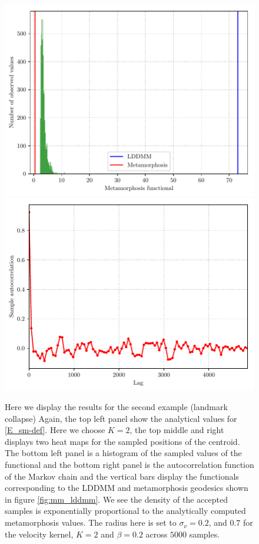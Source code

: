\documentclass[runningheads]{llncs}
\begin{document}
\begin{figure}[h!]
\begin{minipage}{\textwidth}
    \includegraphics[scale=.35]{functional_histogram_squeeze.pdf}
    \includegraphics[scale=.35]{autocorrelation_squeeze.pdf}
    \caption{\footnotesize Here we display the results for the second example (landmark
    collapse) Again, the top left panel show the analytical values for
    \eqref{E_sm-def}. Here we choose $K=2$, the top middle and right displays
    two heat maps for the sampled positions of the centroid. The bottom left
    panel is a histogram of the sampled values of the functional and the bottom
    right panel is the autocorrelation function of the Markov chain and the
    vertical bars display the functionals corresponding to the LDDMM and
    metamorphosis geodesics shown in figure \ref{fig:mm_lddmm}. We see the
    density of the accepted samples is exponentially proportional to the
    analytically computed metamorphosis values. The radius here is set to
    $\sigma_\nu = 0.2$, and $0.7$ for the velocity kernel, $K=2$ and $\beta=0.2$
    across $5000$ samples.} \label{fig:selective:crisscross}
    \label{fig:selective:pinch}
\end{minipage}
\end{figure}
\end{document}
